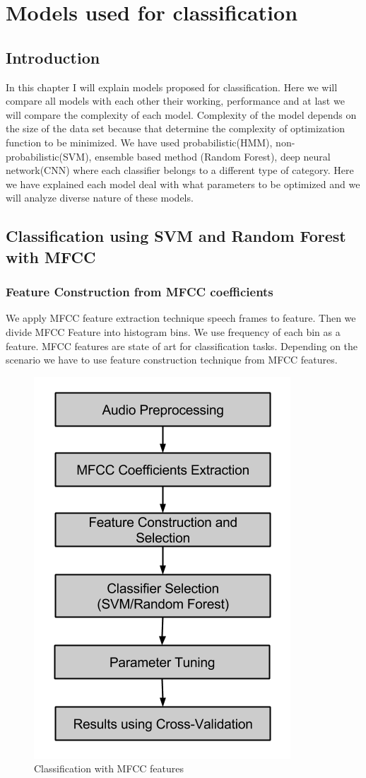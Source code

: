 \documentclass[11pt]{report}
\begin{document}
\newpage 
\chapter{Models used for classification}
\section{Introduction}
In this chapter I will explain models proposed for classification. Here we will compare all models with each other their working, performance and at last we will compare the complexity of each model. Complexity of the model depends on the size of the data set because that determine the complexity of optimization function to be minimized. We have used probabilistic(HMM), non-probabilistic(SVM), ensemble based method (Random Forest), deep neural network(CNN) where each classifier belongs to a different type of category. Here we have explained each model deal with what parameters to be optimized and we  will analyze diverse nature of these models.
\section{Classification using SVM and Random Forest with MFCC}
\subsection{Feature Construction from MFCC coefficients}
We apply MFCC feature extraction technique speech frames to feature. Then we divide MFCC Feature into histogram bins. We use frequency of each bin as a feature. MFCC features are state of art for classification tasks. Depending on the scenario we have to use feature construction technique from MFCC features.
\begin{figure}[h]
\centering
\includegraphics[scale=.6]{./images/mfcc_flow.png}
\caption{Classification with MFCC features}
\end{figure}
\end{document}

